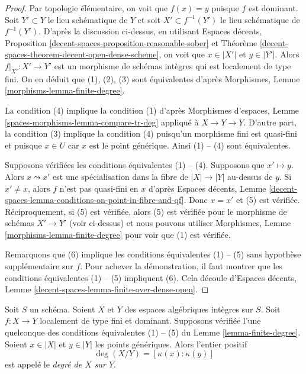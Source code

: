 \begin{proof}
Par topologie élémentaire, on voit que $f(x) = y$ puisque $f$ est dominant.
Soit $Y' \subset Y$ le lieu schématique de $Y$ et soit
$X' \subset f^{-1}(Y')$ le lieu schématique de $f^{-1}(Y')$.
D'après la discussion ci-dessus, en utilisant
Espaces décents, Proposition \ref{decent-spaces-proposition-reasonable-sober} et
Théorème \ref{decent-spaces-theorem-decent-open-dense-scheme},
on voit que $x \in |X'|$ et $y \in |Y'|$.
Alors $f|_{X'} : X' \to Y'$ est un morphisme de schémas intègres
qui est localement de type fini. On en déduit que (1), (2), (3)
sont équivalentes d'après Morphismes, Lemme \ref{morphisms-lemma-finite-degree}.

\medskip\noindent
La condition (4) implique la condition (1) d'après
Morphismes d'espaces, Lemme \ref{spaces-morphisms-lemma-compare-tr-deg}
appliqué à $X \to Y \to Y$.
D'autre part, la condition (3) implique la condition (4) puisqu'un morphisme
fini est quasi-fini et puisque $x \in U$ car $x$
est le point générique. Ainsi (1) -- (4) sont équivalentes.

\medskip\noindent
Supposons vérifiées les conditions équivalentes (1) -- (4). Supposons que
$x' \mapsto y$. Alors $x \leadsto x'$ est une spécialisation dans la
fibre de $|X| \to |Y|$ au-dessus de $y$. Si $x' \not = x$, alors $f$ n'est pas
quasi-fini en $x$ d'après Espaces décents, Lemme
\ref{decent-spaces-lemma-conditions-on-point-in-fibre-and-qf}.
Donc $x = x'$ et (5) est vérifiée. Réciproquement, si (5) est vérifiée, alors
(5) est vérifiée pour le morphisme de schémas $X' \to Y'$ (voir ci-dessus)
et nous pouvons utiliser
Morphismes, Lemme \ref{morphisms-lemma-finite-degree}
pour voir que (1) est vérifiée.

\medskip\noindent
Remarquons que (6) implique les conditions équivalentes (1) -- (5)
sans hypothèse supplémentaire sur $f$. Pour achever la démonstration,
il faut montrer que les conditions équivalentes (1) -- (5) impliquent (6).
Cela découle d'Espaces décents, Lemme
\ref{decent-spaces-lemma-finite-over-dense-open}.
\end{proof}

\begin{definition}
\label{definition-degree}
Soit $S$ un schéma.
Soient $X$ et $Y$ des espaces algébriques intègres sur $S$.
Soit $f : X \to Y$ localement de type fini et dominant.
Supposons vérifiée l'une quelconque des conditions équivalentes (1) -- (5) du
Lemme \ref{lemma-finite-degree}. Soient $x \in |X|$ et $y \in |Y|$
les points génériques. Alors l'entier positif
$$
\deg(X/Y) = [\kappa(x) : \kappa(y)]
$$
est appelé le {\it degré de $X$ sur $Y$}.
\end{definition}

